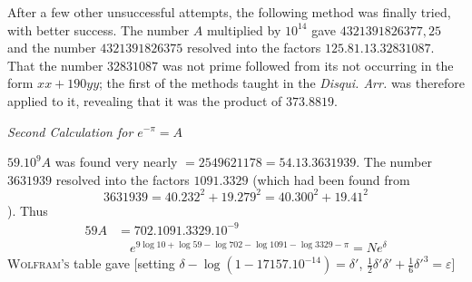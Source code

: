 After a few other unsuccessful attempts, the following method was finally
tried, with better success. The number $A$ multiplied by $10^{14}$ gave $4321391826377,25$
and the number $4321391826375$ resolved into the factors $125.81.13.32831087$. That
the number $32831087$ was not prime followed from its not occurring in the
form $xx+190yy$; the first of the methods taught in the \textit{Disqui. Arr.}
was therefore applied to it, revealing that it was the product
of $373.8819$.

\begin{center}\textit{Second Calculation for $e^{-\pi}=A$}\end{center}

$59.10^9A$ was found very nearly $=2549621178=54.13.3631939$. The number
$3631939$ resolved into the factors $1091.3329$ (which had been found from
\[
3631939=40.232^2+19.279^2=40.300^2+19.41^2
\]
). Thus
\[
\begin{aligned}59A&=702.1091.3329.10^{-9}\\[7pt]&\quad{}e^{9\log10+\log59-\log702-\log1091-\log3329-\pi}=Ne^\delta\end{aligned}
\]
\textsc{Wolfram's} table gave [setting $\delta-\log(1-17157.10^{-14})=\delta'$,
\hfill\break{} $\frac12\delta'\delta'+\frac16\delta'^3=\varepsilon$]
